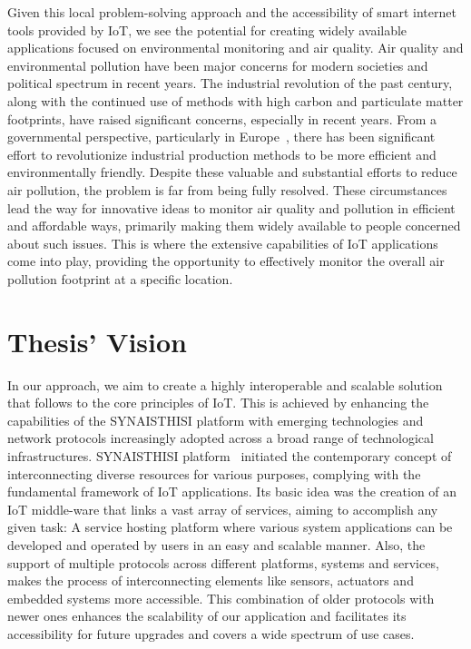 Given this local problem-solving approach and the accessibility of smart internet tools provided by IoT, we see the potential for creating widely available applications focused on environmental monitoring and air quality. Air quality and environmental pollution have been major concerns for modern societies and political spectrum in recent years\cite{harper2017environment}. The industrial revolution of the past century, along with the continued use of methods with high carbon and particulate matter footprints, have raised significant concerns, especially in recent years\cite{EuropeanEnvironmentAgency}. From a governmental perspective, particularly in Europe~\cite{EuropeEnvironment}, there has been significant effort to revolutionize industrial production methods to be more efficient and environmentally friendly. Despite these valuable and substantial efforts to reduce air pollution, the problem is far from being fully resolved. These circumstances lead the way for innovative ideas to monitor air quality and pollution in efficient and affordable ways, primarily making them widely available to people concerned about such issues. This is where the extensive capabilities of IoT applications come into play, providing the opportunity to effectively monitor the overall air pollution footprint at a specific location\cite{MobileAirPollutionMonitoring}.

\section{Thesis' Vision}
In our approach, we aim to create a highly interoperable and scalable solution that follows to the core principles of IoT. This is achieved by enhancing the capabilities of the SYNAISTHISI platform with emerging technologies and network protocols increasingly adopted across a broad range of technological infrastructures. SYNAISTHISI platform~\cite{Synaisthisi} initiated the contemporary concept of interconnecting diverse resources for various purposes, complying with the fundamental framework of IoT applications. Its basic idea was the creation of an IoT middle-ware that links a vast array of services, aiming to accomplish any given task: A service hosting platform where various system applications can be developed and operated by users in an easy and scalable manner. Also, the support of multiple protocols across different platforms, systems and services, makes the process of interconnecting elements like sensors, actuators and embedded systems more accessible. This combination of older protocols with newer ones enhances the scalability of our application and facilitates its accessibility for future upgrades and covers a wide spectrum of use cases.

